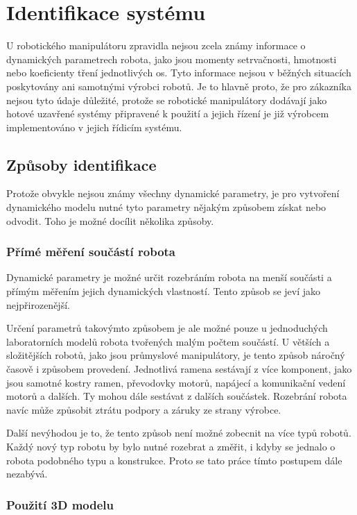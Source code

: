 

\chapter{Identifikace systému}

U robotického manipulátoru zpravidla nejsou zcela známy informace o dynamických parametrech robota, jako jsou momenty setrvačnosti, hmotnosti nebo koeficienty tření jednotlivých os. Tyto informace nejsou v běžných situacích poskytovány ani samotnými výrobci robotů. Je to hlavně proto, že pro zákazníka nejsou tyto údaje důležité, protože se robotické manipulátory dodávají jako hotové uzavřené systémy připravené k použití a jejich řízení je již výrobcem implementováno v jejich řídicím systému.

\section{Způsoby identifikace}

Protože obvykle nejsou známy všechny dynamické parametry, je pro vytvoření dynamického modelu nutné tyto parametry nějakým způsobem získat nebo odvodit. Toho je možné docílit několika způsoby.

\subsection{Přímé měření součástí robota}

Dynamické parametry je možné určit rozebráním robota na menší součásti a přímým měřením jejich dynamických vlastností. Tento způsob se jeví jako nejpřirozenější.

Určení parametrů takovýmto způsobem je ale možné pouze u jednoduchých laboratorních modelů robota tvořených malým počtem součástí. U větších a složitějších robotů, jako jsou průmyslové manipulátory, je tento způsob náročný časově i způsobem provedení. Jednotlivá ramena sestávají z více komponent, jako jsou samotné kostry ramen, převodovky motorů, napájecí a komunikační vedení motorů a dalších. Ty mohou dále sestávat z dalších součástek. Rozebrání robota navíc může způsobit ztrátu podpory a záruky ze strany výrobce.

Další nevýhodou je to, že tento způsob není možné zobecnit na více typů robotů. Každý nový typ robotu by bylo nutné rozebrat a změřit, i kdyby se jednalo o robota podobného typu a konstrukce. Proto se tato práce tímto postupem dále nezabývá.    

\subsection{Použití 3D modelu}

